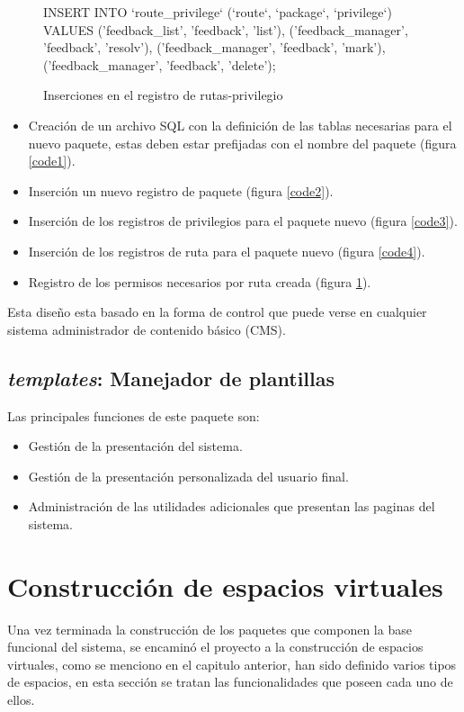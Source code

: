 \begin{figure}
\centering
\begin{SQL}
INSERT INTO `route_privilege`
(`route`, `package`, `privilege`)
VALUES
('feedback_list',    'feedback', 'list'),
('feedback_manager', 'feedback', 'resolv'),
('feedback_manager', 'feedback', 'mark'),
('feedback_manager', 'feedback', 'delete');
\end{SQL}
\caption{Inserciones en el registro de rutas-privilegio}
\label{code5}
\end{figure}

\begin{itemize}
\item Creación de un archivo SQL con la definición de las tablas necesarias para
el nuevo paquete, estas deben estar prefijadas con el nombre del paquete
(figura \ref{code1}).
\item Inserción un nuevo registro de paquete (figura \ref{code2}).
\item Inserción de los registros de privilegios para el paquete nuevo
(figura \ref{code3}).
\item Inserción de los registros de ruta para el paquete nuevo
(figura \ref{code4}).
\item Registro de los permisos necesarios por ruta creada
(figura \ref{code5}).
\end{itemize}

Esta diseño esta basado en la forma de control que puede verse en cualquier
sistema administrador de contenido básico (CMS).

\subsection{\emph{templates}: Manejador de plantillas}
Las principales funciones de este paquete son:

\begin{itemize}
\item Gestión de la presentación del sistema.
\item Gestión de la presentación personalizada del usuario final.
\item Administración de las utilidades adicionales que presentan las paginas
del sistema.
\end{itemize}

\section{Construcción de espacios virtuales}
Una vez terminada la construcción de los paquetes que componen la base funcional
del sistema, se encaminó el proyecto a la construcción de espacios virtuales,
como se menciono en el capitulo anterior, han sido definido varios tipos de
espacios, en esta sección se tratan las funcionalidades que poseen cada uno de
ellos.

